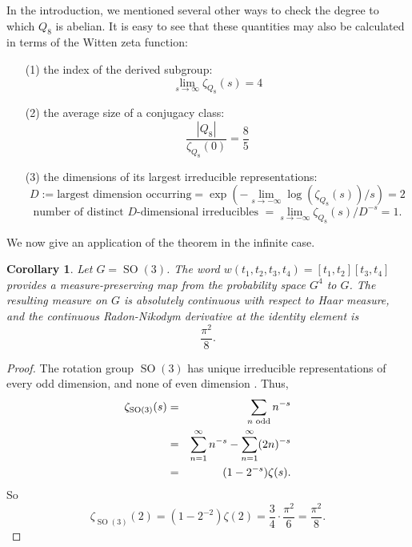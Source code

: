 \documentclass[12pt]{article}
\newtheorem{cor}[thm]{Corollary}
\newcommand{\be}{\begin{equation}}
\newcommand{\ee}{\end{equation}}
\newcommand{\bea}{\begin{eqnarray}}
\newcommand{\eea}{\end{eqnarray}}
\newcommand{\nn}{\nonumber}
\DeclareMathOperator{\SO}{SO}
\begin{document}
In the introduction, we mentioned several other ways to check the degree to which $Q_8$ is abelian.  It is easy to see that these quantities may also be calculated in terms of the Witten zeta function:
\begin{itemize}
\item[(1)] the index of the derived subgroup: \\
\be 
\lim_{s \rightarrow \infty } \zeta_{Q_8} (s) = 4
\ee
\item[(2)] the average size of a conjugacy class:
\be 
\frac{|Q_8|}{\zeta_{Q_8}(0)} = \frac{8}{5}
\ee
\item[(3)] the dimensions of its largest irreducible representations:
\be
D := \mbox{largest dimension occurring} =  \exp\left(-\lim_{s \rightarrow -\infty} \log (\zeta_{Q_8} (s))/s \right)=2
\ee
\be 
\mbox{number of distinct $D$-dimensional irreducibles } = \lim_{s \rightarrow -\infty} \zeta_{Q_8}(s)/D^{-s}=1.
\ee
\end{itemize}

We now give an application of the theorem in the infinite case.

\begin{cor} Let $G=\SO(3)$.  The word $w(t_1,t_2,t_3,t_4) = [t_1,t_2][t_3,t_4]$ provides a measure-preserving map from the probability space $G^4$ to $G$.  The resulting measure on $G$ is absolutely continuous with respect to Haar measure, and the continuous Radon-Nikodym derivative at the identity element is
\be \frac{\pi^2}{8}. \ee
\end{cor}
\begin{proof}
The rotation group $\SO(3)$ has unique irreducible representations of every odd dimension, and none of even dimension \cite{bro}.  Thus,
\bea 
\zeta_{\SO(3)}(s) &=& \sum_{n \mbox{\begin{scriptsize} odd\end{scriptsize}}} n^{-s}\nn\\
                  &=& \sum_{n=1}^\infty n^{-s} - \sum_{n=1}^\infty (2n)^{-s}\nn\\
                  &=& (1-2^{-s})\zeta(s).
\eea
So
\be 
\zeta_{\SO(3)}(2) = (1-2^{-2})\zeta(2) = \frac{3}{4} \cdot \frac{\pi^2}{6} = \frac{\pi^2}{8}.
\ee
\end{proof}
\end{document}
